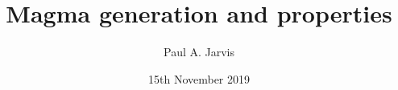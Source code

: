 \documentclass{beamer}
\title[Modeling volcanic processes]{Magma generation and properties} %
\author[Paul Jarvis]{Paul A. Jarvis} %
\institute[UNIGE] %
{
\textit{paul.jarvis@unige.ch} %
}
\date{15th November 2019} %
\begin{document}
\begin{frame}
\titlepage %
\end{frame}





\end{document}
